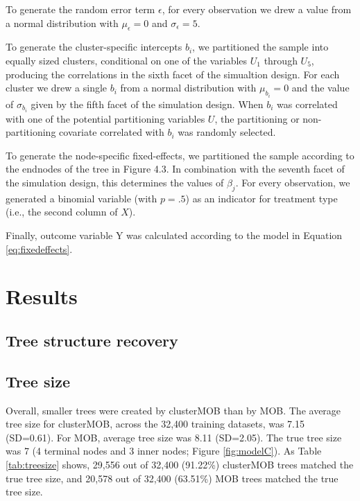 \documentclass[nobf,man]{apa}
\begin{document}
To generate the random error term $\epsilon$, for every observation we drew a value from a normal distribution with $\mu_{\epsilon} = 0$ and $\sigma_{\epsilon} = 5$. 

To generate the cluster-specific intercepts $b_i$, we partitioned the sample into equally sized clusters, conditional on one of the variables $U_1$ through $U_5$, producing the correlations in the sixth facet of the simualtion design. For each cluster we drew a single $b_i$ from a normal distribution with $\mu_{b_i} = 0$ and the value of $\sigma_{b_i}$ given by the fifth facet of the simulation design. When $b_i$ was correlated with one of the potential partitioning variables $U$, the partitioning or non-partitioning covariate correlated with $b_i$ was randomly selected.

To generate the node-specific fixed-effects, we partitioned the sample according to the endnodes of the tree in Figure 4.3. In combination with the seventh facet of the simulation design, this determines the values of $\beta_j$. For every observation, we generated a binomial variable (with $p =.5$) as an indicator for treatment type (i.e., the second column of $X$). 

Finally, outcome variable Y was calculated according to the model in Equation \ref{eq:fixedeffects}. 


\section{Results}

\subsection{Tree structure recovery}

\subsection{Tree size}

Overall, smaller trees were created by clusterMOB than by MOB. The average tree size for clusterMOB, across the 32,400 training datasets, was 7.15 (SD=0.61). For MOB, average tree size was 8.11 (SD=2.05). The true tree size was 7 (4 terminal nodes and 3 inner nodes; Figure \ref{fig:modelC}). As Table \ref{tab:treesize} shows, 29,556 out of 32,400 (91.22\%) clusterMOB trees matched the true tree size, and 20,578 out of 32,400 (63.51\%) MOB trees matched the true tree size.
\end{document}
